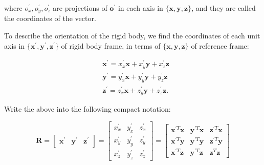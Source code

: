 \documentclass[10pt]{article}
\begin{document}
where $o_{x}^{\prime}, o_{y}^{\prime}, o_{z}^{\prime}$ are  projections of   $\boldsymbol{o}^{\prime}$ in each axis in $\{\boldsymbol{x}, \boldsymbol{y}, \boldsymbol{z}\}$, and they are called the coordinates of the vector.

\smallskip

To describe the  orientation of the rigid body, we find the coordinates of each unit axis in $\{\boldsymbol{x}^{\prime}, \boldsymbol{y}^{\prime}, \boldsymbol{z}^{\prime}\}$ of rigid body frame, in terms of $\{\boldsymbol{x}, \boldsymbol{y}, \boldsymbol{z}\}$ of reference frame:

$$
    \begin{aligned}
& \boldsymbol{x}^{\prime}=x_{x}^{\prime} \boldsymbol{x}+x_{y}^{\prime} \boldsymbol{y}+x_{z}^{\prime} \boldsymbol{z} \\
& \boldsymbol{y}^{\prime}=y_{x}^{\prime} \boldsymbol{x}+y_{y}^{\prime} \boldsymbol{y}+y_{z}^{\prime} \boldsymbol{z} \\
& \boldsymbol{z}^{\prime}=z_{x}^{\prime} \boldsymbol{x}+z_{y}^{\prime} \boldsymbol{y}+z_{z}^{\prime} \boldsymbol{z} .
\end{aligned}
$$

Write the above into the following compact notation:

$$
    \boldsymbol{R}=\left[\begin{array}{lll}
\boldsymbol{x}^{\prime} & \boldsymbol{y}^{\prime} & \boldsymbol{z}^{\prime} 
\end{array}\right]=\left[\begin{array}{ccc}
x_{x}^{\prime} & y_{x}^{\prime} & z_{x}^{\prime} \\
x_{y}^{\prime} & y_{y}^{\prime} & z_{y}^{\prime} \\
x_{z}^{\prime} & y_{z}^{\prime} & z_{z}^{\prime}
\end{array}\right]=\left[\begin{array}{lll}
\boldsymbol{x}^{\prime T} \boldsymbol{x} & \boldsymbol{y}^{\prime T} \boldsymbol{x} & \boldsymbol{z}^{\prime T} \boldsymbol{x} \\
\boldsymbol{x}^{\prime T} \boldsymbol{y} & \boldsymbol{y}^{\prime T} \boldsymbol{y} & \boldsymbol{z}^{\prime T} \boldsymbol{y} \\
\boldsymbol{x}^{\prime T} \boldsymbol{z} & \boldsymbol{y}^{\prime T} \boldsymbol{z} & \boldsymbol{z}^{T} \boldsymbol{z}
\end{array}\right]
$$
\end{document}
